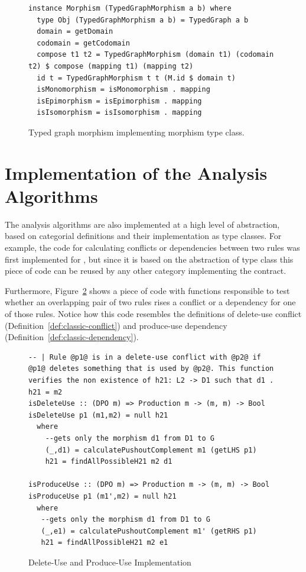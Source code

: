 \begin{figure}[!ht]
\caption{Typed graph morphism implementing morphism type class.}
\begin{verbatim}
instance Morphism (TypedGraphMorphism a b) where
  type Obj (TypedGraphMorphism a b) = TypedGraph a b
  domain = getDomain
  codomain = getCodomain
  compose t1 t2 = TypedGraphMorphism (domain t1) (codomain t2) $ compose (mapping t1) (mapping t2)
  id t = TypedGraphMorphism t t (M.id $ domain t)
  isMonomorphism = isMonomorphism . mapping
  isEpimorphism = isEpimorphism . mapping
  isIsomorphism = isIsomorphism . mapping
\end{verbatim}
\label{fig:verigraph:morphism-implementation}
\end{figure}

\section{Implementation of the Analysis Algorithms}

The analysis algorithms are also implemented at a high level of abstraction, based on categorial definitions and their implementation as type classes. For example, the code for calculating conflicts or dependencies between two rules was first implemented for , but since it is based on the abstraction of  type class this piece of code can be reused by any other category implementing the  contract.

Furthermore, Figure~\ref{fig:verigraph:delete-use-produce-use} shows a piece of code with functions responsible to test whether an overlapping pair of two rules rises a conflict or a dependency for one of those rules. Notice how this code resembles the definitions of delete-use conflict (Definition~\ref{def:classic-conflict}) and produce-use dependency (Definition~\ref{def:classic-dependency}).


\begin{figure}[!ht]
\caption{Delete-Use and Produce-Use Implementation}
\begin{verbatim}
-- | Rule @p1@ is in a delete-use conflict with @p2@ if @p1@ deletes something that is used by @p2@. This function verifies the non existence of h21: L2 -> D1 such that d1 . h21 = m2
isDeleteUse :: (DPO m) => Production m -> (m, m) -> Bool
isDeleteUse p1 (m1,m2) = null h21
  where
    --gets only the morphism d1 from D1 to G
    (_,d1) = calculatePushoutComplement m1 (getLHS p1) 
    h21 = findAllPossibleH21 m2 d1

isProduceUse :: (DPO m) => Production m -> (m, m) -> Bool
isProduceUse p1 (m1',m2) = null h21
  where
   --gets only the morphism d1 from D1 to G
   (_,e1) = calculatePushoutComplement m1' (getRHS p1)
   h21 = findAllPossibleH21 m2 e1
\end{verbatim}
\label{fig:verigraph:delete-use-produce-use}
\end{figure}

